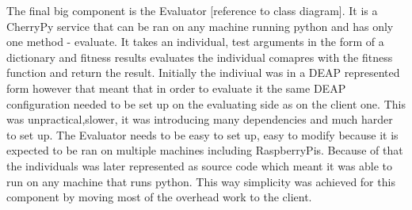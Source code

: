 The final big component is the Evaluator [reference to class diagram]. It is a CherryPy service that can be ran on any machine running python and
 has only one method - evaluate. It takes an individual, test arguments in the form of a dictionary and  fitness
results evaluates the individual comapres with the fitness function and return the result. Initially the indiviual was in a DEAP
represented form however that meant that in order to evaluate it the same DEAP configuration needed to be set up on the evaluating side as on the client one.
This was unpractical,slower, it was introducing many dependencies and much harder to set up. The Evaluator needs
to be easy to set up, easy to modify because it is expected to be ran on multiple machines including RaspberryPis.
Because of that the individuals was later represented as source code which meant it was able to run on any machine
that runs python. This way simplicity was achieved for this component by moving most of the overhead work to the client.
